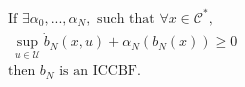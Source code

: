 \documentclass[preview]{standalone}
\begin{document}
\begin{align*}
&\text{If } \exists \alpha_0, ..., \alpha_N,\text{ such  that }\forall x \in \mathcal{C}^*,\\ &\ \sup_{u \in \mathcal{U}} \dot b_N(x, u) + \alpha_N(b_N(x)) \geq 0\\ &\text{then } b_N \text{ is an ICCBF.}
\end{align*}
\end{document}
